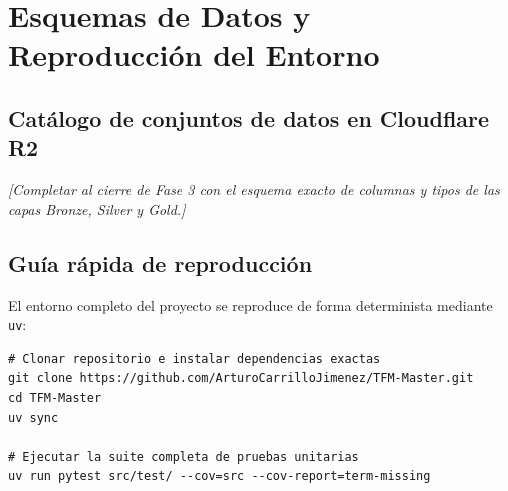 \chapter{Esquemas de Datos y Reproducción del Entorno}

\section{Catálogo de conjuntos de datos en Cloudflare R2}
\textit{[Completar al cierre de Fase 3 con el esquema exacto de columnas y tipos de las capas Bronze, Silver y Gold.]}

\section{Guía rápida de reproducción}
El entorno completo del proyecto se reproduce de forma determinista mediante \texttt{uv}:

\begin{lstlisting}
# Clonar repositorio e instalar dependencias exactas
git clone https://github.com/ArturoCarrilloJimenez/TFM-Master.git
cd TFM-Master
uv sync

# Ejecutar la suite completa de pruebas unitarias
uv run pytest src/test/ --cov=src --cov-report=term-missing
\end{lstlisting}
